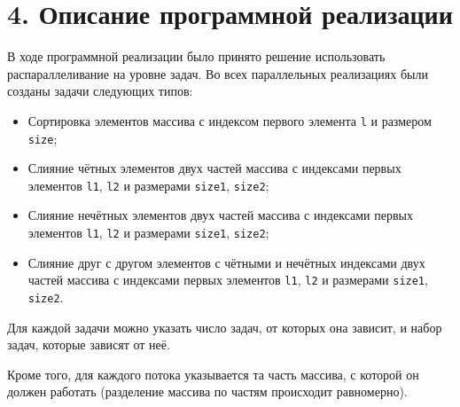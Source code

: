 \documentclass{report}
\begin{document}
    \section*{4. Описание программной реализации}
    \par В ходе программной реализации было принято решение использовать распараллеливание на уровне задач. Во всех параллельных реализациях были созданы задачи следующих типов:
    \begin{itemize}
        \item Сортировка элементов массива с индексом первого элемента \verb|l| и размером \verb|size|;
        \item Слияние чётных элементов двух частей массива с индексами первых элементов \verb|l1|, \verb|l2| и размерами \verb|size1|, \verb|size2|;
        \item Слияние нечётных элементов двух частей массива с индексами первых элементов \verb|l1|, \verb|l2| и размерами \verb|size1|, \verb|size2|;
        \item Слияние друг с другом элементов с чётными и нечётных индексами двух частей массива с индексами первых элементов \verb|l1|, \verb|l2| и размерами \verb|size1|, \verb|size2|.
    \end{itemize}
    \par Для каждой задачи можно указать число задач, от которых она зависит, и набор задач, которые зависят от неё.
    \par Кроме того, для каждого потока указывается та часть массива, с которой он должен работать (разделение массива по частям происходит равномерно).

\end{document}
